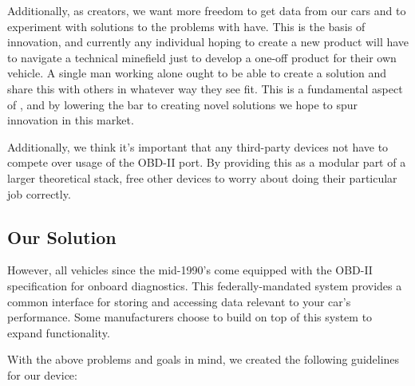 \documentclass[10pt,letterpaper,unboxed,cm]{article}
\begin{document}
Additionally, as creators, we want more freedom to get data from our cars and to experiment with solutions to the problems with have. This is the basis of innovation, and currently any individual hoping to create a new product will have to navigate a technical minefield just to develop a one-off product for their own vehicle. A single man working alone ought to be able to create a solution and share this with others in whatever way they see fit. This is a fundamental aspect of , and by lowering the bar to creating novel solutions we hope to spur innovation in this market.

Additionally, we think it's important that any third-party devices not have to compete over usage of the OBD-II port. By providing this as a modular part of a larger theoretical stack, free other devices to worry about doing their particular job correctly. 

\subsection{Our Solution}

However, all vehicles since the mid-1990's come equipped with the OBD-II specification for onboard diagnostics. This federally-mandated system provides a common interface for storing and accessing data relevant to your car's performance. Some manufacturers choose to build on top of this system to expand functionality.

With the above problems and goals in mind, we created the following guidelines for our device:
\end{document}
